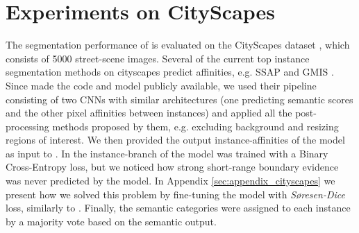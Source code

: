 
\section{Experiments on CityScapes}\label{sec:cityscapes_exp}
The segmentation performance of \algname{} is evaluated on the CityScapes dataset \cite{cordts2016cityscapes}, which consists of 5000 street-scene images.
Several of the current top instance segmentation methods on cityscapes predict affinities, e.g. SSAP \cite{Gao_2019_ICCV} and GMIS \cite{liu2018affinity}. 
Since \cite{liu2018affinity} made the code and model publicly available, we used their pipeline consisting of two CNNs with similar architectures (one predicting semantic scores and the other pixel affinities between instances) and applied all the post-processing methods proposed by them, e.g. excluding background and resizing regions of interest. We then provided the output instance-affinities of the model as input to \algname{}. 
In \cite{liu2018affinity} the instance-branch of the model was trained with a Binary Cross-Entropy loss, but we noticed how strong short-range boundary evidence was never predicted by the model. In Appendix \ref{sec:appendix_cityscapes} we present how we solved this problem by fine-tuning the model with \emph{S\o resen-Dice} loss, similarly to \cite{wolf2018mutex}. Finally, the semantic categories were assigned to each instance by a majority vote based on the semantic output. 

